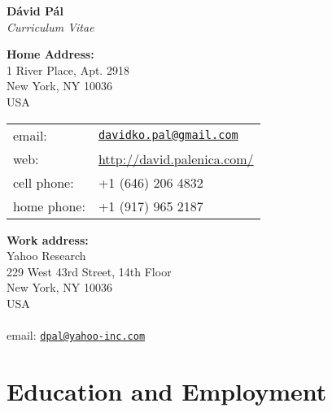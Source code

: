 \documentclass[10pt]{article}
\begin{document}
\begin{center}
{\huge \textbf{D\'avid P\'al}} \\[0.2cm]
\emph{Curriculum Vitae}
\end{center}

\vspace{0.2cm}

%
\noindent
\begin{minipage}[t]{10cm}
\textbf{Home Address:} \\
1 River Place, Apt. 2918 \\
New York, NY 10036 \\
USA \\

\begin{tabular}{@{}ll}
email:       & \href{mailto:davidko.pal@gmail.com}{\texttt{davidko.pal@gmail.com}} \\
web:         & \url{http://david.palenica.com/} \\
cell phone:  & +1 (646) 206 4832 \\
home phone:  & +1 (917) 965 2187 \\
\end{tabular}
\end{minipage}
%
\begin{minipage}[t]{10cm}
\textbf{Work address:} \\
Yahoo Research \\
229 West 43rd Street, 14th Floor \\
New York, NY 10036 \\
USA \\
\\
email: \href{mailto:dpal@yahoo-inc.com}{\texttt{dpal@yahoo-inc.com}} \\
\end{minipage}

\section*{Education and Employment}
\end{document}
